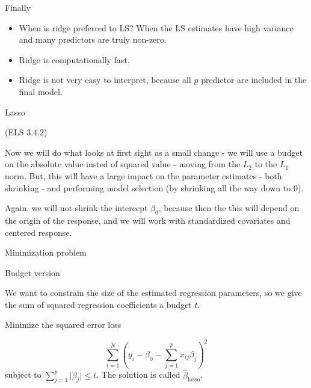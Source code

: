 \documentclass[
  ignorenonframetext,
]{beamer}
\providecommand{\tightlist}{%
  \setlength{\itemsep}{0pt}\setlength{\parskip}{0pt}}
\begin{document}
\begin{frame}

\begin{block}{Finally}

\begin{itemize}
\tightlist
\item
  When is ridge preferred to LS? When the LS estimates have high
  variance and many predictors are truly non-zero.
\item
  Ridge is computationally fast.
\item
  Ridge is not very easy to interpret, because all \(p\) predictor are
  included in the final model.
\end{itemize}

\end{block}

\end{frame}

\begin{frame}{Lasso}
\protect\hypertarget{lasso}{}

(ELS 3.4.2)

Now we will do what looks at first sight as a small change - we will use
a budget on the absolute value insted of squared value - moving from the
\(L_2\) to the \(L_1\) norm. But, this will have a large impact on the
parameter estimates - both shrinking - and performing model selection
(by shrinking all the way down to 0).

Again, we will not shrink the intercept \(\beta_0\), because then the
this will depend on the origin of the response, and we will work with
standardized covariates and centered response.

\end{frame}

\begin{frame}

\begin{block}{Minimization problem}

\begin{block}{Budget version}

We want to constrain the size of the estimated regression parameters, so
we give the sum of squared regression coefficients a budget \(t\).

Minimize the squared error loss

\[ \sum_{i=1}^N (y_i-\beta_0-\sum_{j=1}^p x_{ij}\beta_j )^2 \] subject
to \(\sum_{j=1}^p \lvert \beta_j\rvert \le t\). The solution is called
\(\hat{\beta}_{\text{lasso}}\).

\end{block}

\end{block}

\end{frame}
\end{document}
